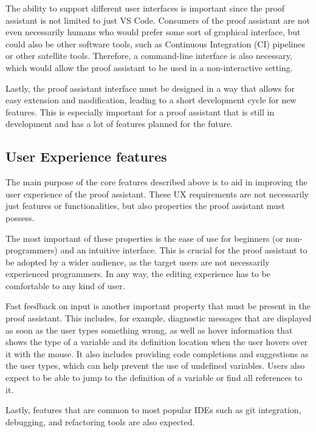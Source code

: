 The ability to support different user interfaces is important since the proof assistant is not limited to just VS Code.
Consumers of the proof assistant are not even necessarily humans who would prefer some sort of graphical interface,
but could also be other software tools, such as Continuous Integration (CI) pipelines or other satellite tools.
Therefore, a command-line interface is also necessary, which would allow the proof assistant to be used in a non-interactive setting.

Lastly, the proof assistant interface must be designed in a way that allows for easy extension and modification,
leading to a short development cycle for new features.
This is especially important for a proof assistant that is still in development and has a lot of features planned for the future.


\subsection{User Experience features}

The main purpose of the core features described above is to aid in improving the user experience of the proof assistant.
These UX requirements are not necessarily just features or functionalities, but also properties the proof assistant must possess.

The most important of these properties is the ease of use for beginners (or non-programmers) and an intuitive interface.
This is crucial for the proof assistant to be adopted by a wider audience, as the target users are not necessarily
experienced programmers.
In any way, the editing experience has to be comfortable to any kind of user.

Fast feedback on input is another important property that must be present in the proof assistant.
This includes, for example, diagnostic messages that are displayed as soon as the user types something wrong,
as well as hover information that shows the type of a variable and its definition location when the user hovers over it with the mouse.
It also includes providing code completions and suggestions as the user types, which can help prevent the use of undefined variables.
Users also expect to be able to jump to the definition of a variable or find all references to it.

Lastly, features that are common to most popular IDEs such as git integration, debugging, and refactoring tools are also expected.

